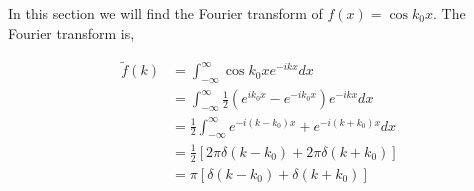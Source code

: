 \documentclass[11pt]{amsart}
\begin{document}
In this section we will find the Fourier transform of $f(x) = \cos{k_0 x}$. The Fourier transform is,

\begin{align*}
  \tilde{f}(k) &= \int_{-\infty}^{\infty} \cos{k_0 x} e^{-ikx} dx \\
               &= \int_{-\infty}^{\infty} \frac{1}{2}\left(e^{ik_0 x} - e^{-ik_0 x}\right) e^{-ikx} dx \\
               &= \frac{1}{2} \int_{-\infty}^{\infty} e^{-i(k-k_0)x} + e^{-i(k+k_0)x} dx \\
               &= \frac{1}{2} \left[2\pi\delta(k-k_0) + 2\pi \delta(k+k_0)\right] \\
               &= \pi \left[\delta(k-k_0) + \delta(k+k_0)\right]
\end{align*}
\end{document}
